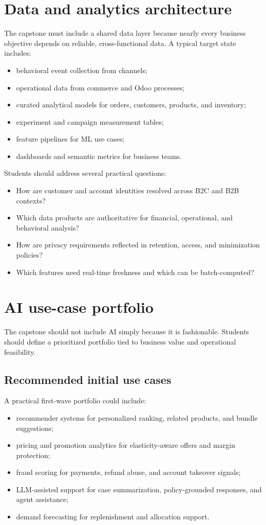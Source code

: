 \section{Data and analytics architecture}
The capstone must include a shared data layer because nearly every business objective depends on reliable, cross-functional data. A typical target state includes:
\begin{itemize}
  \item behavioral event collection from channels;
  \item operational data from commerce and Odoo processes;
  \item curated analytical models for orders, customers, products, and inventory;
  \item experiment and campaign measurement tables;
  \item feature pipelines for ML use cases;
  \item dashboards and semantic metrics for business teams.
\end{itemize}

Students should address several practical questions:
\begin{itemize}
  \item How are customer and account identities resolved across B2C and B2B contexts?
  \item Which data products are authoritative for financial, operational, and behavioral analysis?
  \item How are privacy requirements reflected in retention, access, and minimization policies?
  \item Which features need real-time freshness and which can be batch-computed?
\end{itemize}

\section{AI use-case portfolio}
The capstone should not include AI simply because it is fashionable. Students should define a prioritized portfolio tied to business value and operational feasibility.

\subsection{Recommended initial use cases}
A practical first-wave portfolio could include:
\begin{itemize}
  \item recommender systems for personalized ranking, related products, and bundle suggestions;
  \item pricing and promotion analytics for elasticity-aware offers and margin protection;
  \item fraud scoring for payments, refund abuse, and account takeover signals;
  \item LLM-assisted support for case summarization, policy-grounded responses, and agent assistance;
  \item demand forecasting for replenishment and allocation support.
\end{itemize}

